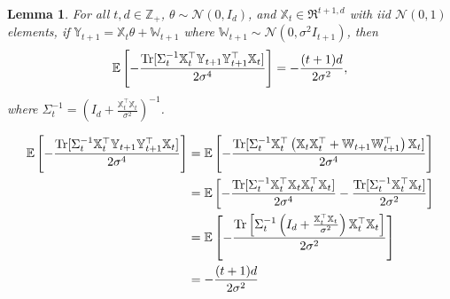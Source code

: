 \documentclass[twoside,11pt]{article}
\renewenvironment{proof}{\par\noindent{\bf Proof\ }}{\hfill\BlackBox\\[2mm]}
\newenvironment{proof}{\par\noindent{\bf Proof\ }}{\hfill\BlackBox\\[2mm]}
\newtheorem{lemma}[theorem]{Lemma}
\def\normal{\mathcal{N}}
\def\E{\mathbb{E}}
\begin{document}
\begin{lemma}
    \label{le:trace_eq}
    For all $t, d\in \mathbb{Z}_{+}$, $\theta\sim\normal(0, I_d)$, and $\mathbb{X}_{t}\in\Re^{t+1, d}$ with iid $\normal(0, 1)$ elements, if $\mathbb{Y}_{t+1} = \mathbb{X}_t \theta + \mathbb{W}_{t+1}$ where $\mathbb{W}_{t+1}\sim\normal(0, \sigma^2I_{t+1})$, then
    $$\E\left[- \frac{{\rm Tr}[\Sigma_{t}^{-1}\mathbb{X}_{t}^\top\mathbb{Y}_{t+1}\mathbb{Y}_{t+1}^\top\mathbb{X}_{t}]}{2\sigma^4}\right] = -\frac{(t+1)d}{2\sigma^2},$$
    where $\Sigma^{-1}_t = \left(I_d + \frac{\mathbb{X}_t^\top\mathbb{X}_t}{\sigma^2}\right)^{-1}$.
\end{lemma}
\begin{proof}
    \begin{align*}
        \E\left[- \frac{{\rm Tr}[\Sigma_{t}^{-1}\mathbb{X}_{t}^\top\mathbb{Y}_{t+1}\mathbb{Y}_{t+1}^\top\mathbb{X}_{t}]}{2\sigma^4}\right]
        & = \E\left[- \frac{{\rm Tr}[\Sigma_{t}^{-1}\mathbb{X}_{t}^\top\left( \mathbb{X}_{t}\mathbb{X}_{t}^\top + \mathbb{W}_{t+1}\mathbb{W}_{t+1}^\top \right)\mathbb{X}_{t}]}{2\sigma^4}\right]\\
        & = \E\left[-\frac{{\rm Tr}[\Sigma^{-1}_{t}\mathbb{X}_{t}^\top \mathbb{X}_{t}\mathbb{X}_{t}^\top\mathbb{X}_{t}]}{2\sigma^4} - \frac{{\rm Tr}[\Sigma^{-1}_{t}\mathbb{X}_{t}^\top\mathbb{X}_{t}]}{2\sigma^2}\right]\\
        & = \E\left[-\frac{{\rm Tr}\left[\Sigma_{t}^{-1}\left(I_d + \frac{\mathbb{X}^\top_{t}\mathbb{X}_{t}}{\sigma^2}\right)\mathbb{X}_{t}^\top\mathbb{X}_{t}\right]}{2\sigma^2}\right]\\
        & = -\frac{(t+1)d}{2\sigma^2}
    \end{align*}
\end{proof}
\end{document}
